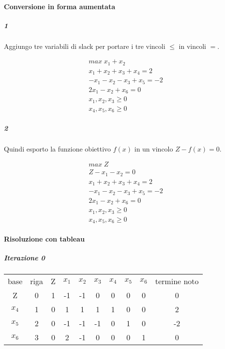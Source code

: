 \paragraph{Conversione in forma aumentata}

\subparagraph{1}

Aggiungo tre variabili di slack per portare i tre vincoli $\leq$ in vincoli $=$.

\begin{align}
    \text{$max \; x_1 + x_2$} \\
    \text{$x_1 + x_2 + x_3 + x_4 = 2$} \\
    \text{$- x_1 - x_2 - x_3 + x_5 = - 2$} \\
    \text{$2 x_1 - x_2 + x_6 = 0$} \\
    \text{$x_1, x_2, x_3 \geq 0$} \\
    \text{$x_4, x_5, x_6 \geq 0$}
\end{align}

\subparagraph{2}

Quindi esporto la funzione obiettivo $f(x)$ in un vincolo $Z - f(x) = 0$.

\begin{align}
    \text{$max \; Z$} \\
    \text{$Z - x_1 - x_2 = 0$} \\
    \text{$x_1 + x_2 + x_3 + x_4 = 2$} \\
    \text{$- x_1 - x_2 - x_3 + x_5 = - 2$} \\
    \text{$2 x_1 - x_2 + x_6 = 0$} \\
    \text{$x_1, x_2, x_3 \geq 0$} \\
    \text{$x_4, x_5, x_6 \geq 0$}
\end{align}

\paragraph{Risoluzione con tableau}

\subparagraph{Iterazione 0}

\begin{center}
    \begin{tabular}{|c|c|c|c|c|c|c|c|c|c|}
        base & riga & Z & $x_1$ & $x_2$ & $x_3$ & $x_4$ & $x_5$ & $x_6$ & termine noto \\
        Z & 0 & 1 & -1 & -1 &  0 &  0 &  0 &  0 &  0 \\
        $x_4$ & 1 & 0 &  1 &  1 &  1 &  1 &  0 &  0 &  2 \\
        $x_5$ & 2 & 0 & -1 & -1 & -1 &  0 &  1 &  0 & -2 \\
        $x_6$ & 3 & 0 &  2 & -1 &  0 &  0 &  0 &  1 &  0
    \end{tabular}
\end{center}

